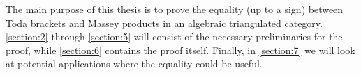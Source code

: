 The main purpose of this thesis is to prove the equality (up to a sign) between Toda brackets and Massey products in an algebraic triangulated category. \autoref{section:2} through \autoref{section:5} will consist of the necessary preliminaries for the proof, while \autoref{section:6} contains the proof itself. Finally, in \autoref{section:7} we will look at potential applications where the equality could be useful.
